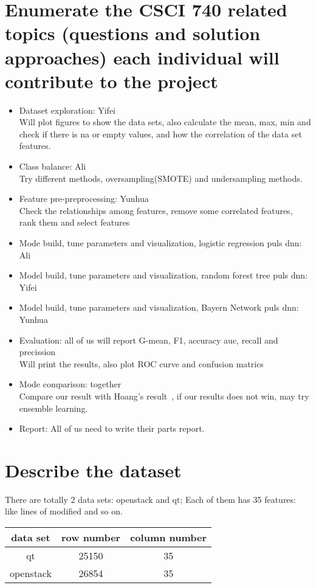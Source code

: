 \documentclass{article}
\begin{document}
\section{Enumerate the CSCI 740 related topics (questions and solution approaches) each individual will contribute
	to the project}
\begin{itemize}
	\item Dataset exploration: Yifei\\
	Will plot figures to show the data sets, also calculate the mean, max, min and check if there is na or empty values, and how the correlation of the data set features.
	\item Class balance: Ali  \\
	Try different methods, oversampling(SMOTE) and undersampling methods.
	\item Feature pre-preprocessing: Yunhua  \\
	Check the relationships among features, remove some correlated features, rank them and select features
	\item Mode build, tune parameters and visualization, logistic regression puls dnn: Ali
	\item Model build, tune parameters and visualization, random forest tree puls dnn: Yifei
	\item Model build, tune parameters and visualization, Bayern Network puls dnn: Yunhua
	\item Evaluation: all of us will report G-mean, F1, accuracy auc, recall and precission \\
	Will print the results, also plot ROC curve and confusion matrics
	\item Mode comparison: together \\
	Compare our result with Hoang's result~\cite{hoang2019deepjit}, if our results does not win, may try ensemble learning.
	\item Report: All of us need to write their parts report.
\end{itemize}

\section{Describe the dataset}
There are totally 2 data sets: openstack and qt; Each of them has 35 features: like lines of modified and so on.
\begin{center}
	\begin{tabular}{ c c c }
		data set & row number & column number \\ 
		\hline
		qt & 25150 & 35 \\ 
		openstack & 26854 & 35 \\  
		\hline
	\end{tabular}
\end{center}
\end{document}
